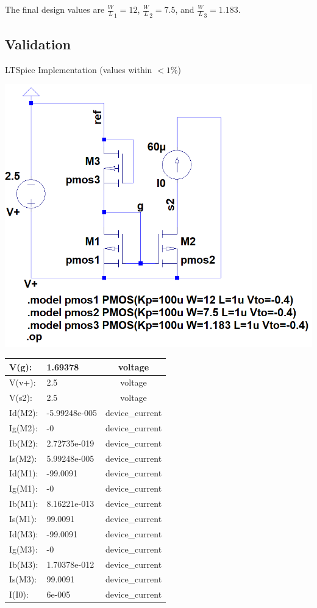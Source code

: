 \documentclass[12pt,letterpaper,titlepage]{article}
\begin{document}
\begin{raggedright}
The final design values are $\frac{W}{L}_1 = 12$, $\frac{W}{L}_2 = 7.5$, and $\frac{W}{L}_3 = 1.183$.

\clearpage
\subsection{Validation}

\begin{center}
LTSpice Implementation (values within $<1\%$)
\begin{paracol}{2}
\includegraphics[width=.48\textwidth, height=\textheight, keepaspectratio=true]{ds1b}
\switchcolumn
\begin{tabular}{|l|l|c|}
  \hline V(g):	   & 1.69378	   & voltage
\\\hline V(v+):	   & 2.5	       & voltage
\\\hline V(s2):	   & 2.5	       & voltage
\\\hline Id(M2):   & -5.99248e-005 & device\_current
\\\hline Ig(M2):   & -0	           & device\_current
\\\hline Ib(M2):   & 2.72735e-019  & device\_current
\\\hline Is(M2):   & 5.99248e-005  & device\_current
\\\hline Id(M1):   & -99.0091	   & device\_current
\\\hline Ig(M1):   & -0	           & device\_current
\\\hline Ib(M1):   & 8.16221e-013  & device\_current
\\\hline Is(M1):   & 99.0091	   & device\_current
\\\hline Id(M3):   & -99.0091	   & device\_current
\\\hline Ig(M3):   & -0	           & device\_current
\\\hline Ib(M3):   & 1.70378e-012  & device\_current
\\\hline Is(M3):   & 99.0091	   & device\_current
\\\hline I(I0):	   & 6e-005	       & device\_current

\end{tabular}
\end{paracol}
\end{center}
\end{raggedright}
\end{document}
